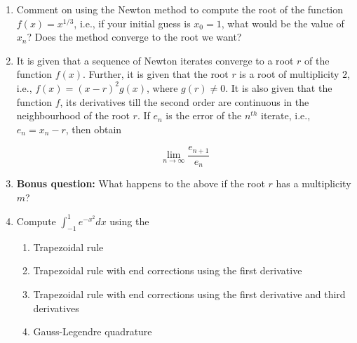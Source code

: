 \documentclass[a4paper,11pt]{report}
\begin{document}
\begin{enumerate}
    
    

    




























    \item Comment on using the Newton method to compute the root of the function $f(x)
    = x^{1/3}$, i.e., if your initial guess is $x_{0} = 1$, what would be the value of
    $x_{n}$? Does the method converge to the root we want?

    \item It is given that a sequence of Newton iterates converge to a root $r$ of the
    function $f(x)$. Further, it is given that the root $r$ is a root of multiplicity
    $2$, i.e., $f(x) = (x - r)^{2} g(x)$, where $g(r) \ne 0$. It is also given that the
    function $f$, its derivatives till the second order are continuous in the
    neighbourhood of the root $r$. If $e_{n}$ is the error of the $n^{th}$ iterate,
    i.e., $e_{n} = x_{n} - r$, then obtain

        \begin{equation*}
        \lim_{n \rightarrow \infty} \frac{e_{n+1}}{e_{n}}
        \end{equation*}

    \item \textbf{Bonus question:} What happens to the above if the root $r$ has a
    multiplicity $m$?

    \item Compute $\displaystyle \int_{-1}^{1} e^{-x^{2}} dx$ using the

    \begin{enumerate}
    \item Trapezoidal rule
    \item Trapezoidal rule with end corrections using the first derivative
    \item Trapezoidal rule with end corrections using the first derivative and third
    derivatives
    \item Gauss-Legendre quadrature
    \end{enumerate}


\end{enumerate}
\end{document}
